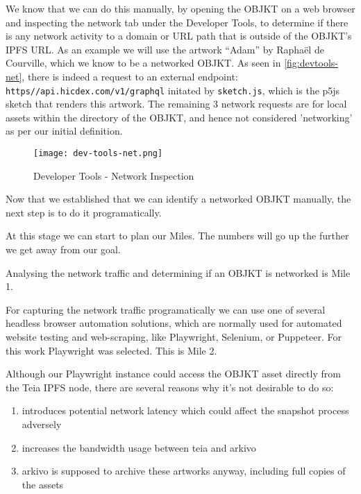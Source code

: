 We know that we can do this manually, by opening the OBJKT on a web browser and inspecting the network tab under the Developer Tools, to determine if there is any network activity to a domain or URL path that is outside of the OBJKT's IPFS URL. As an example we will use the artwork ``Adam'' by Raphaël de Courville\footnotemark[1], which we know to be a networked OBJKT.
As seen in \autoref{fig:devtools-net}, there is indeed a request to an external endpoint: \texttt{https\://api.hicdex.com/v1/graphql} initated by \texttt{sketch.js}, which is the p5js sketch that renders this artwork. The remaining 3 network requests are for local assets within the directory of the OBJKT, and hence not considered 'networking' as per our initial definition.


\begin{figure}[h]
    \centering
    \texttt{[image: dev-tools-net.png]}
    \caption[Developer Tools - Network Inspection]{Developer Tools - Network Inspection}
    \label{fig:devtools-net}
\end{figure}

Now that we established that we can identify a networked OBJKT manually, the next step is to do it programatically.

At this stage we can start to plan our Miles. The numbers will go up the further we get away from our goal.

Analysing the network traffic and determining if an OBJKT is networked is Mile 1.


For capturing the network traffic programatically we can use one of several headless browser automation solutions, which are normally used for automated website testing and web-scraping, like Playwright\footnotemark[2], Selenium\footnotemark[3], or Puppeteer\footnotemark[4]. For this work Playwright was selected. This is Mile 2.



Although our Playwright instance could access the OBJKT asset directly from the Teia IPFS node, there are several reasons why it's not desirable to do so:

\begin{enumerate}
	\item introduces potential network latency which could affect the snapshot process adversely
	\item increases the bandwidth usage between teia and arkivo
	\item arkivo is supposed to archive these artworks anyway, including full copies of the assets
\end{enumerate}

